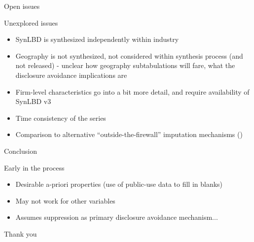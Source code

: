 \begin{frame}{Open issues}
\begin{block}{Unexplored issues}
\begin{itemize}[<+->]
\item SynLBD is synthesized independently within industry
\item Geography is not synthesized, not considered within synthesis process (and not released) 
- unclear how geography subtabulations will fare, what the disclosure avoidance implications are
\item Firm-level characteristics go into a bit more detail, and require availability of SynLBD v3
\item Time consistency of the series
\item Comparison to alternative ``outside-the-firewall'' imputation mechanisms 
(\cite{HolanEtAl2010,BradleyEtAl2014})
\end{itemize}
\end{block}
\end{frame}


\begin{frame}{Conclusion}
\begin{block}{Early in the process}
\begin{itemize}
\item Desirable a-priori properties (use of public-use data to fill in blanks)
\item May not work for other variables
\item Assumes suppression as primary disclosure avoidance mechanism...
\end{itemize}\end{block}
\end{frame}

\setcounter{finalframe}{\value{framenumber}}
\setcounter{framenumber}{\value{finalframe}}


\begin{frame}
Thank you
\end{frame}


%



